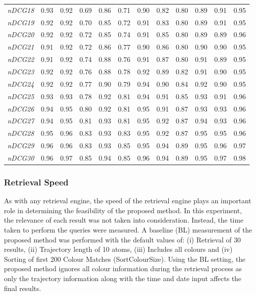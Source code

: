 \begin{table}[ht!]
{\begin{tabular}{c||c|c|c|c|c|c|c|c|c|c|c}
\textit{nDCG18} & 0.93 & 0.92 & 0.69 & 0.86 & 0.71 & 0.90 & 0.82 & 0.80 & 0.89 & 0.91 & 0.95 \\
\textit{nDCG19} & 0.92 & 0.92 & 0.70 & 0.85 & 0.72 & 0.91 & 0.83 & 0.80 & 0.89 & 0.91 & 0.95 \\
\textit{nDCG20} & 0.92 & 0.92 & 0.72 & 0.85 & 0.74 & 0.91 & 0.85 & 0.80 & 0.89 & 0.89 & 0.96 \\
\textit{nDCG21} & 0.91 & 0.92 & 0.72 & 0.86 & 0.77 & 0.90 & 0.86 & 0.80 & 0.90 & 0.90 & 0.95 \\
\textit{nDCG22} & 0.91 & 0.92 & 0.74 & 0.88 & 0.76 & 0.91 & 0.87 & 0.80 & 0.91 & 0.89 & 0.95 \\
\textit{nDCG23} & 0.92 & 0.92 & 0.76 & 0.88 & 0.78 & 0.92 & 0.89 & 0.82 & 0.91 & 0.90 & 0.95 \\
\textit{nDCG24} & 0.92 & 0.92 & 0.77 & 0.90 & 0.79 & 0.94 & 0.90 & 0.84 & 0.92 & 0.90 & 0.95 \\
\textit{nDCG25} & 0.93 & 0.93 & 0.78 & 0.92 & 0.81 & 0.94 & 0.91 & 0.85 & 0.93 & 0.91 & 0.96 \\
\textit{nDCG26} & 0.94 & 0.95 & 0.80 & 0.92 & 0.81 & 0.95 & 0.91 & 0.87 & 0.93 & 0.93 & 0.96 \\
\textit{nDCG27} & 0.94 & 0.95 & 0.81 & 0.93 & 0.81 & 0.95 & 0.92 & 0.87 & 0.94 & 0.93 & 0.96 \\
\textit{nDCG28} & 0.95 & 0.96 & 0.83 & 0.93 & 0.83 & 0.95 & 0.92 & 0.87 & 0.95 & 0.95 & 0.96 \\
\textit{nDCG29} & 0.96 & 0.96 & 0.83 & 0.93 & 0.85 & 0.95 & 0.94 & 0.89 & 0.95 & 0.96 & 0.97 \\
\textit{nDCG30} & 0.96 & 0.97 & 0.85 & 0.94 & 0.85 & 0.96 & 0.94 & 0.89 & 0.95 & 0.97 & 0.98 \\
\end{tabular}}
\end{table}


\subsubsection{Retrieval Speed}

As with any retrieval engine, the speed of the retrieval engine plays an
important role in determining the feasibility of the proposed method. In this
experiment, the relevance of each result was not taken into consideration.
Instead, the time taken to perform the queries were measured. A baseline (BL)
measurement of the proposed method was performed with the default values of:
(i) Retrieval of 30 results, (ii) Trajectory length of 10 atoms, (iii) Includes
all colours and (iv) Sorting of first 200 Colour Matches (SortColourSize).
Using the BL setting, the proposed method ignores all colour information during
the retrieval process as only the trajectory information along with the time
and date input affects the final results.

